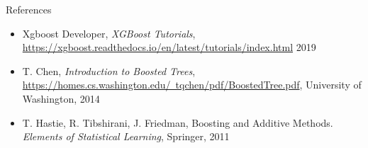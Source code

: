 \documentclass{beamer}
\begin{document}
    \begin{frame}{References}
        \begin{itemize}
            \item Xgboost Developer, \textit{XGBoost Tutorials}, \href{https://xgboost.readthedocs.io/en/latest/tutorials/index.html}{https://xgboost.readthedocs.io/en/latest/tutorials/index.html} 2019
            \item T. Chen, \textit{Introduction to Boosted Trees}, \href{https://homes.cs.washington.edu/~tqchen/pdf/BoostedTree.pdf}{https://homes.cs.washington.edu/~tqchen/pdf/BoostedTree.pdf}, University of Washington, 2014
            \item T. Hastie, R. Tibshirani, J. Friedman, Boosting and Additive Methods. \textit{Elements of Statistical Learning}, Springer, 2011
        \end{itemize}
    \end{frame}
\end{document}
